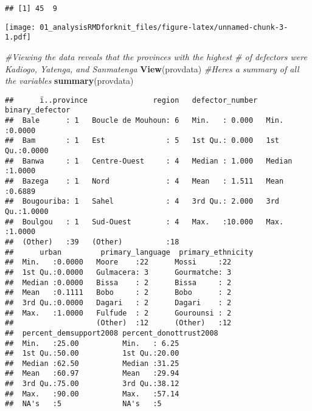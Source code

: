 \documentclass[]{article}
\newenvironment{Shaded}{\begin{snugshade}}{\end{snugshade}}
\newcommand{\CommentTok}[1]{\textcolor[rgb]{0.56,0.35,0.01}{\textit{#1}}}
\newcommand{\KeywordTok}[1]{\textcolor[rgb]{0.13,0.29,0.53}{\textbf{#1}}}
\newcommand{\NormalTok}[1]{#1}
\newcommand{\OperatorTok}[1]{\textcolor[rgb]{0.81,0.36,0.00}{\textbf{#1}}}
\begin{document}
\begin{verbatim}
## [1] 45  9
\end{verbatim}

\begin{Shaded}
\end{Shaded}

\texttt{[image: 01\_analysisRMDforknit\_files/figure-latex/unnamed-chunk-3-1.pdf]}

\begin{Shaded}
\begin{Highlighting}[]
\CommentTok{\#Viewing the data reveals that the provinces with the highest \# of defectors were Kadiogo, Yatenga, and Sanmatenga}
\KeywordTok{View}\NormalTok{(provdata)}
\CommentTok{\#Here\textquotesingle{}s a summary of all the variables}
\KeywordTok{summary}\NormalTok{(provdata)}
\end{Highlighting}
\end{Shaded}

\begin{verbatim}
##      ï..province               region   defector_number  binary_defector 
##  Bale      : 1   Boucle de Mouhoun: 6   Min.   : 0.000   Min.   :0.0000  
##  Bam       : 1   Est              : 5   1st Qu.: 0.000   1st Qu.:0.0000  
##  Banwa     : 1   Centre-Ouest     : 4   Median : 1.000   Median :1.0000  
##  Bazega    : 1   Nord             : 4   Mean   : 1.511   Mean   :0.6889  
##  Bougouriba: 1   Sahel            : 4   3rd Qu.: 2.000   3rd Qu.:1.0000  
##  Boulgou   : 1   Sud-Ouest        : 4   Max.   :10.000   Max.   :1.0000  
##  (Other)   :39   (Other)          :18                                    
##      urban         primary_language  primary_ethnicity
##  Min.   :0.0000   Moore    :22      Mossi     :22     
##  1st Qu.:0.0000   Gulmacera: 3      Gourmatche: 3     
##  Median :0.0000   Bissa    : 2      Bissa     : 2     
##  Mean   :0.1111   Bobo     : 2      Bobo      : 2     
##  3rd Qu.:0.0000   Dagari   : 2      Dagari    : 2     
##  Max.   :1.0000   Fulfude  : 2      Gourounsi : 2     
##                   (Other)  :12      (Other)   :12     
##  percent_demsupport2008 percent_donottrust2008
##  Min.   :25.00          Min.   : 6.25         
##  1st Qu.:50.00          1st Qu.:20.00         
##  Median :62.50          Median :31.25         
##  Mean   :60.97          Mean   :29.94         
##  3rd Qu.:75.00          3rd Qu.:38.12         
##  Max.   :90.00          Max.   :57.14         
##  NA's   :5              NA's   :5
\end{verbatim}
\end{document}
